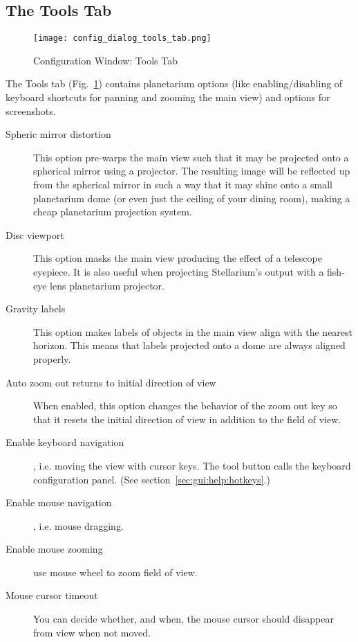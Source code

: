 \subsection{The Tools Tab}
\label{sec:gui:configuration:tools}

\begin{figure}[htbp]
\centering\texttt{[image: config\_dialog\_tools\_tab.png]}
\caption{Configuration Window: Tools Tab}
\label{fig:gui:configuration:tools}
\end{figure}

The Tools tab (Fig.~\ref{fig:gui:configuration:tools}) contains planetarium options 
(like enabling/disabling of keyboard shortcuts for panning and zooming the main view) 
and options for screenshots.

\begin{description}
\item[Spheric mirror distortion] This option pre-warps the main view
  such that it may be projected onto a spherical mirror using a
  projector. The resulting image will be reflected up from the spherical
  mirror in such a way that it may shine onto a small planetarium
  dome (or even just the ceiling of your dining room), making a cheap planetarium projection system.
\item[Disc viewport] This option masks the main view
  producing the effect of a telescope eyepiece. It is also useful when
  projecting Stellarium's output with a fish-eye lens planetarium
  projector.
\item[Gravity labels] This option makes labels of objects in the
  main view align with the nearest horizon. This means that labels
  projected onto a dome are always aligned properly.
\item[Auto zoom out returns to initial direction of view] When enabled,
  this option changes the behavior of the zoom out key
  \key{\textbackslash{}} so that it resets the initial direction of view in
  addition to the field of view.
\item[Enable keyboard navigation], i.e. moving the view with cursor keys. The tool button calls the keyboard configuration panel. (See section~\ref{sec:gui:help:hotkeys}.)
\item[Enable mouse navigation], i.e. mouse dragging. 
\item[Enable mouse zooming] use mouse wheel to zoom field of view.
\item[Mouse cursor timeout] You can decide whether, and when, the
  mouse cursor should disappear from view when not moved.


\end{description}
